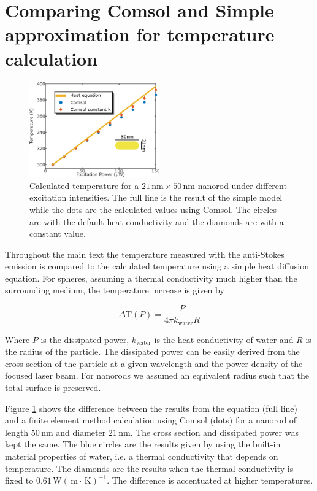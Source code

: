 \documentclass[journal=nalefd,manuscript=letter]{achemso}
\newcommand{\K}{\ensuremath{\,\textrm{K}}}
\newcommand{\nm}{\ensuremath{\,\textrm{nm}}}
\newcommand{\m}{\ensuremath{\,\textrm{m}}}
\newcommand{\W}{\ensuremath{\,\textrm{W}}}
\begin{document}
\section{Comparing Comsol and Simple approximation for temperature calculation}
\begin{figure}[htp] \centering
\includegraphics[width=0.5\textwidth]{Figures/Supplementary/03_Compare_Comsol/03_Compare_Comsol.png}
\caption{Calculated temperature for a $21\nm\times 50\nm$ nanorod under
different excitation intensities. The full line is the result of the simple
model while the dots are the calculated values using Comsol. The circles are
with the default heat conductivity and the diamonds are with a constant value.}
	\label{fig:Compare-Comsol}
\end{figure}

Throughout the main text the temperature measured with the anti-Stokes emission
is compared to the calculated temperature using a simple heat diffusion
equation. For spheres, assuming a thermal conductivity much higher than the
surrounding medium, the temperature increase is given by

\begin{equation}
	\Delta \textrm{T}(P) = \frac{P}{4\pi k_{\textrm{water}} R}
\end{equation}

Where $P$ is the dissipated power, $k_{\textrm{water}}$ is the heat conductivity
of water and $R$ is the radius of the particle. The dissipated power can be
easily derived from the cross section of the particle at a given wavelength and
the power density of the focused laser beam. For nanorods we assumed an
equivalent radius such that the total surface is preserved.

Figure \ref{fig:Compare-Comsol} shows the difference between the results from
the equation (full line) and a finite element method calculation using Comsol
(dots) for a nanorod of length $50\nm$ and diameter $21\nm$. The cross section
and dissipated power was kept the same. The blue circles are the results given
by using the built-in material properties of water, i.e. a thermal conductivity
that depends on temperature. The diamonds are the results when the thermal
conductivity is fixed to $0.61 \W(\m\cdot\K)^{-1}$. The difference is
accentuated at higher temperatures.
\end{document}
